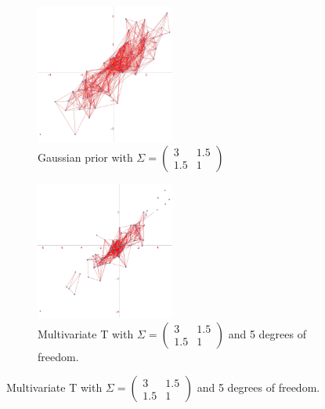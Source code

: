 \documentclass[12pt]{report}
\begin{document}
\begin{table}[!ht]
    \centering
    \tiny
    \caption[Multivariate T with non-diagonal covariance matrix]{Multivariate T with 5 degrees of freedom and covariance matrix $\begin{pmatrix} 3 & 1.5 \\ 1.5 & 1 \end{pmatrix}$ }
    \label{tskewedt}
\end{table}

\begin{figure}[!ht]
\centering
\begin{subfigure}{.5\textwidth}
    \centering
    \includegraphics[width = 0.5\textwidth]{gaussian_rgg_non_spherical1.jpg}
    \caption[Gaussian non-spherical prior]{Gaussian prior with $\Sigma = \begin{pmatrix} 3 & 1.5 \\ 1.5 & 1\end{pmatrix}$}
    \label{fskewedg}
\end{subfigure}%
\begin{subfigure}{.5\textwidth}
    \centering
    \includegraphics[width = 0.5\textwidth]{multivariatet_non_diag.jpg}
    \caption[Multivariate T]{Multivariate T with $\Sigma = \begin{pmatrix} 3 & 1.5 \\ 1.5 & 1\end{pmatrix}$ and 5 degrees of freedom.}
    \label{fskewedt}
\end{subfigure}
\end{figure}
\end{document}
